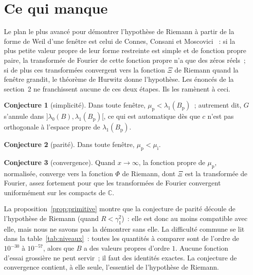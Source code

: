 \documentclass[11pt,a4paper]{article}
\theoremstyle{definition}
\newtheorem{conjecture}{Conjecture}
\theoremstyle{remark}
\begin{document}
\section{Ce qui manque}

Le plan le plus avancé pour démontrer l'hypothèse de Riemann à partir de la forme de Weil d'une fenêtre est celui de Connes,
Consani et Moscovici \cite{ccm}~: si la plus petite valeur propre de leur forme restreinte est simple et de fonction propre paire,
la transformée de Fourier de cette fonction propre n'a que des zéros réels~; si de plus ces transformées convergent vers la
fonction $\Xi$ de Riemann quand la fenêtre grandit, le théorème de Hurwitz donne l'hypothèse. Les énoncés de la section~2 ne
franchissent aucune de ces deux étapes. Ils les ramènent à ceci.

\begin{conjecture}[simplicité]
Dans toute fenêtre, $\mu_{\mathrm p}<\lambda_1(B_{\mathrm p})$~; autrement dit, $G$ s'annule dans
$]\lambda_0(B),\lambda_1(B_{\mathrm p})[$, ce qui est automatique dès que $c$ n'est pas orthogonale à l'espace propre de
$\lambda_1(B_{\mathrm p})$.
\end{conjecture}
\begin{conjecture}[parité]
Dans toute fenêtre, $\mu_{\mathrm p}<\mu_{\mathrm i}$.
\end{conjecture}
\begin{conjecture}[convergence]
Quand $x\to\infty$, la fonction propre de $\mu_{\mathrm p}$, normalisée, converge vers la fonction $\Phi$ de Riemann, dont $\Xi$ est la
transformée de Fourier, assez fortement pour que les transformées de Fourier convergent uniformément sur les compacts de
$\mathbb{C}$.
\end{conjecture}

La proposition~\ref{prop:primitive} montre que la conjecture de parité découle de l'hypothèse de Riemann (quand $R<\gamma_1^2$)~:
elle est donc au moins compatible avec elle, mais nous ne savons pas la démontrer sans elle. La difficulté commune se lit dans la
table~\ref{tab:niveaux}~: toutes les quantités à comparer sont de l'ordre de $10^{-30}$ à $10^{-57}$, alors que $B$ a des
valeurs propres d'ordre $1$. Aucune fonction d'essai grossière ne peut servir~; il faut des identités exactes. La conjecture de
convergence contient, à elle seule, l'essentiel de l'hypothèse de Riemann.
\end{document}
